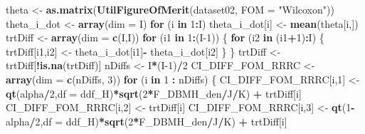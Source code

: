 \documentclass[
]{book}
\newenvironment{Shaded}{\begin{snugshade}}{\end{snugshade}}
\newcommand{\ControlFlowTok}[1]{\textcolor[rgb]{0.13,0.29,0.53}{\textbf{#1}}}
\newcommand{\DataTypeTok}[1]{\textcolor[rgb]{0.13,0.29,0.53}{#1}}
\newcommand{\DecValTok}[1]{\textcolor[rgb]{0.00,0.00,0.81}{#1}}
\newcommand{\KeywordTok}[1]{\textcolor[rgb]{0.13,0.29,0.53}{\textbf{#1}}}
\newcommand{\NormalTok}[1]{#1}
\newcommand{\OperatorTok}[1]{\textcolor[rgb]{0.81,0.36,0.00}{\textbf{#1}}}
\newcommand{\StringTok}[1]{\textcolor[rgb]{0.31,0.60,0.02}{#1}}
\begin{document}
\begin{Shaded}
\begin{Highlighting}[]
\NormalTok{theta \textless{}{-}}\StringTok{ }\KeywordTok{as.matrix}\NormalTok{(}\KeywordTok{UtilFigureOfMerit}\NormalTok{(dataset02, }\DataTypeTok{FOM =} \StringTok{"Wilcoxon"}\NormalTok{))}
\NormalTok{theta\_i\_dot \textless{}{-}}\StringTok{ }\KeywordTok{array}\NormalTok{(}\DataTypeTok{dim =}\NormalTok{ I)}
\ControlFlowTok{for}\NormalTok{ (i }\ControlFlowTok{in} \DecValTok{1}\OperatorTok{:}\NormalTok{I) theta\_i\_dot[i] \textless{}{-}}\StringTok{ }\KeywordTok{mean}\NormalTok{(theta[i,])}
\NormalTok{trtDiff \textless{}{-}}\StringTok{ }\KeywordTok{array}\NormalTok{(}\DataTypeTok{dim =} \KeywordTok{c}\NormalTok{(I,I))}
\ControlFlowTok{for}\NormalTok{ (i1 }\ControlFlowTok{in} \DecValTok{1}\OperatorTok{:}\NormalTok{(I}\DecValTok{{-}1}\NormalTok{)) \{    }
  \ControlFlowTok{for}\NormalTok{ (i2 }\ControlFlowTok{in}\NormalTok{ (i1}\OperatorTok{+}\DecValTok{1}\NormalTok{)}\OperatorTok{:}\NormalTok{I) \{}
\NormalTok{    trtDiff[i1,i2] \textless{}{-}}\StringTok{ }\NormalTok{theta\_i\_dot[i1]}\OperatorTok{{-}}\StringTok{ }\NormalTok{theta\_i\_dot[i2]    }
\NormalTok{  \}}
\NormalTok{\}}
\NormalTok{trtDiff \textless{}{-}}\StringTok{ }\NormalTok{trtDiff[}\OperatorTok{!}\KeywordTok{is.na}\NormalTok{(trtDiff)]}
\NormalTok{nDiffs \textless{}{-}}\StringTok{ }\NormalTok{I}\OperatorTok{*}\NormalTok{(I}\DecValTok{{-}1}\NormalTok{)}\OperatorTok{/}\DecValTok{2}
\NormalTok{CI\_DIFF\_FOM\_RRRC \textless{}{-}}\StringTok{ }\KeywordTok{array}\NormalTok{(}\DataTypeTok{dim =} \KeywordTok{c}\NormalTok{(nDiffs, }\DecValTok{3}\NormalTok{))}
\ControlFlowTok{for}\NormalTok{ (i }\ControlFlowTok{in} \DecValTok{1} \OperatorTok{:}\StringTok{ }\NormalTok{nDiffs) \{}
\NormalTok{  CI\_DIFF\_FOM\_RRRC[i,}\DecValTok{1}\NormalTok{] \textless{}{-}}\StringTok{ }\KeywordTok{qt}\NormalTok{(alpha}\OperatorTok{/}\DecValTok{2}\NormalTok{,}\DataTypeTok{df =}\NormalTok{ ddf\_H)}\OperatorTok{*}\KeywordTok{sqrt}\NormalTok{(}\DecValTok{2}\OperatorTok{*}\NormalTok{F\_DBMH\_den}\OperatorTok{/}\NormalTok{J}\OperatorTok{/}\NormalTok{K) }\OperatorTok{+}\StringTok{ }\NormalTok{trtDiff[i]}
\NormalTok{  CI\_DIFF\_FOM\_RRRC[i,}\DecValTok{2}\NormalTok{] \textless{}{-}}\StringTok{ }\NormalTok{trtDiff[i]}
\NormalTok{  CI\_DIFF\_FOM\_RRRC[i,}\DecValTok{3}\NormalTok{] \textless{}{-}}\StringTok{ }\KeywordTok{qt}\NormalTok{(}\DecValTok{1}\OperatorTok{{-}}\NormalTok{alpha}\OperatorTok{/}\DecValTok{2}\NormalTok{,}\DataTypeTok{df =}\NormalTok{ ddf\_H)}\OperatorTok{*}\KeywordTok{sqrt}\NormalTok{(}\DecValTok{2}\OperatorTok{*}\NormalTok{F\_DBMH\_den}\OperatorTok{/}\NormalTok{J}\OperatorTok{/}\NormalTok{K) }\OperatorTok{+}\StringTok{ }\NormalTok{trtDiff[i]}

\end{Highlighting}
\end{Shaded}
\end{document}
